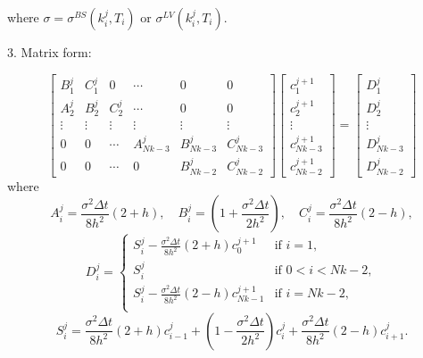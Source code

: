 \documentclass[12pt]{article}
\begin{document}
where $\sigma = \sigma^{BS}(k^j_i,T_i)$ or $\sigma^{LV}(k^j_i,T_i)$. \par
3. Matrix form: \par
\begin{equation}
    \begin{bmatrix}
        B^{j}_{1} & C^{j}_{1} & 0 & \cdots & 0 & 0 \\
        A^{j}_{2} & B^{j}_{2} & C^{j}_{2} & \cdots & 0 & 0 \\
        \vdots & \vdots & \vdots & \vdots & \vdots & \vdots \\
        0 & 0 & \cdots & A^{j}_{Nk-3} & B^{j}_{Nk-3} & C^{j}_{Nk-3} \\
        0 & 0 & \cdots & 0 & B^{j}_{Nk-2} & C^{j}_{Nk-2}
    \end{bmatrix}
    \begin{bmatrix}
        c^{j+1}_{1} \\ c^{j+1}_{2} \\ \vdots \\ c^{j+1}_{Nk-3} \\ c^{j+1}_{Nk-2}
    \end{bmatrix} = 
    \begin{bmatrix}
        D^{j}_{1} \\ D^{j}_{2} \\ \vdots \\ D^{j}_{Nk-3} \\ D^{j}_{Nk-2}
    \end{bmatrix}
\end{equation}
where
\begin{equation}
    A^j_i = \frac{\sigma^2 \Delta t}{8h^2}(2+h), \quad B^j_i = (1+ \frac{\sigma^2 \Delta t}{2h^2}), \quad C^j_i = \frac{\sigma^2 \Delta t}{8h^2}(2-h),
\end{equation}
\begin{equation}
     D^j_i = 
     \begin{cases}
        S^j_i - \frac{\sigma^2 \Delta t}{8h^2}(2+h)c^{j+1}_{0} & \text{if } i=1, \\
        S^j_i & \text{if } 0<i<Nk-2, \\
        S^j_i - \frac{\sigma^2 \Delta t}{8h^2}(2-h)c^{j+1}_{Nk-1} & \text{if } i=Nk-2, \\
     \end{cases}
\end{equation}
\begin{equation}
S^j_i = \frac{\sigma^2 \Delta t}{8h^2}(2+h)c^{j}_{i-1} + (1- \frac{\sigma^2 \Delta t}{2h^2})c^{j}_{i} + \frac{\sigma^2 \Delta t}{8h^2}(2-h)c^{j}_{i+1}.
\end{equation}
\end{document}
